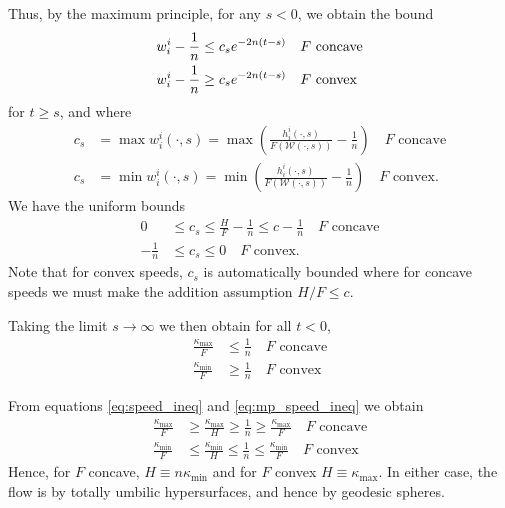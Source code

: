 \documentclass{amsart}
\begin{document}
{Thus, by the maximum principle, for any $s<0$, we obtain the bound
\begin{align*}
w^i_i-\frac{1}{n} &\leq c_s e^{-2n(t-s)} \quad \text{$F$ concave} \\
w^i_i-\frac{1}{n} &\geq c_s e^{-2n(t-s)} \quad \text{$F$ convex}
\end{align*}
for $t\geq s$, and where
\begin{align*}
c_s &= \max w^i_i(\cdot, s) = \max \left(\frac{h^i_i(\cdot, s)}{F(\mathcal{W}(\cdot, s))} - \frac{1}{n}\right) \quad \text{$F$ concave} \\
c_s &= \min w^i_i(\cdot, s) = \min \left(\frac{h^i_i(\cdot, s)}{F(\mathcal{W}(\cdot, s))} - \frac{1}{n}\right) \quad \text{$F$ convex}.
\end{align*}
We have the uniform bounds
\begin{align*}
0 &\leq c_s \leq \frac{H}{F} - \frac{1}{n} \leq c - \frac{1}{n} \quad \text{$F$ concave} \\
-\frac{1}{n} &\leq c_s \leq 0 \quad \text{$F$ convex}.
\end{align*}
Note that for convex speeds, $c_s$ is automatically bounded where for concave speeds we must make the addition assumption $H/F \leq c$.

Taking the limit $s\to \infty$ we then obtain for all $t < 0$,
\begin{equation}
\label{eq:mp_speed_ineq}
\begin{split}
\frac{\kappa_{\max}}{F} &\leq \frac{1}{n} \quad \text{$F$ concave} \\
\frac{\kappa_{\min}}{F} &\geq \frac{1}{n} \quad \text{$F$ convex}
\end{split}
\end{equation}

From equations \eqref{eq:speed_ineq} and \eqref{eq:mp_speed_ineq} we obtain
\[
\begin{split}
\frac{\kappa_{\max}}{F} &\geq \frac{\kappa_{\max}}{H} \geq \frac{1}{n} \geq \frac{\kappa_{\max}}{F} \quad \text{$F$ concave} \\
\frac{\kappa_{\min}}{F} &\leq \frac{\kappa_{\min}}{H} \leq \frac{1}{n} \leq \frac{\kappa_{\min}}{F} \quad \text{$F$ convex}
\end{split}
\]
Hence, for $F$ concave, $H\equiv n\kappa_{\min}$ and for $F$ convex $H\equiv \kappa_{\max}$. In either case, the flow is by totally umbilic hypersurfaces, and hence by geodesic spheres.
}
\end{document}
